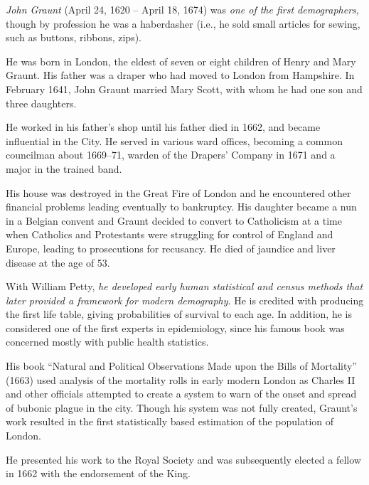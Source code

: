 \emph{John Graunt} (April 24, 1620 – April 18, 1674) was \emph{one of the first demographers}, though by profession he was a haberdasher (i.e., he sold small articles for sewing, such as buttons, ribbons, zips).
	
	He was born in London, the eldest of seven or eight children of Henry and Mary Graunt. His father was a draper who had moved to London from Hampshire. In February 1641, John Graunt married Mary Scott, with whom he had one son and three daughters.
	
	He worked in his father's shop until his father died in 1662, and became influential in the City. He served in various ward offices, becoming a common councilman about 1669–71, warden of the Drapers' Company in 1671 and a major in the trained band.
	
	His house was destroyed in the Great Fire of London and he encountered other financial problems leading eventually to bankruptcy. His daughter became a nun in a Belgian convent and Graunt decided to convert to Catholicism at a time when Catholics and Protestants were struggling for control of England and Europe, leading to prosecutions for recusancy. He died of jaundice and liver disease at the age of 53.
	
	With William Petty, \emph{he developed early human statistical and census methods that later provided a framework for modern demography}. He is credited with producing the first life table, giving probabilities of survival to each age. In addition, he is considered one of the first experts in epidemiology, since his famous book was concerned mostly with public health statistics.
	
	His book \enquote{Natural and Political Observations Made upon the Bills of Mortality} (1663) used analysis of the mortality rolls in early modern London as Charles II and other officials attempted to create a system to warn of the onset and spread of bubonic plague in the city. Though his system was not fully created, Graunt's work resulted in the first statistically based estimation of the population of London.
	
	He presented his work to the Royal Society and was subsequently elected a fellow in 1662 with the endorsement of the King. 
